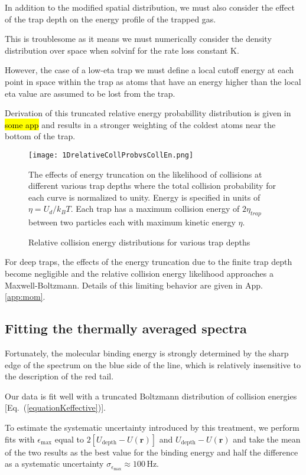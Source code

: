 In addition to the modified spatial distribution, we must also consider the effect of the trap depth on the energy profile of the trapped gas.

This is troublesome as it means we must numerically consider the density distribution over space when solvinf for the rate loss constant K. 

However, the case of a low-eta trap we must define a local cutoff energy at each point in space within the trap as atoms that have an energy higher than the local eta value are assumed to be lost from the trap.



Derivation of this truncated relative energy probabillity distribution is given in \hl{some app} and results in a stronger weighting of the coldest atoms near the bottom of the trap.
	\begin{figure} 
	\centerline{
	  \texttt{[image: 1DrelativeCollProbvsCollEn.png]}}
	  \caption{Relative collision energy distributions for various trap depths}{The effects of energy truncation on the likelihood of collisions at different various trap depths where the total collision probability for each curve is normalized to unity. Energy is specified in units of $\eta = U_d/k_B T$. Each trap has a maximum collision energy of $2\eta_{trap}$ between two particles each with maximum kinetic energy $\eta$.}
	  \label{fig:relativeCollProb}
	\end{figure}
For deep traps, the effects of the energy truncation due to the finite trap depth become negligible and the relative collision energy likelihood approaches a Maxwell-Boltzmann.
Details of this limiting behavior are given in App.\,\ref{app:mom}.


\subsection{Fitting the thermally averaged spectra} \label{sec:lowIntSpectra}



Fortunately, the molecular binding energy is strongly determined by the sharp edge of the spectrum on the blue side of the line, which is relatively insensitive to the description of the red tail.

Our data is fit well with a truncated Boltzmann distribution of collision energies [Eq.~(\ref{equationKeffective})].

To estimate the systematic uncertainty introduced by this treatment, we perform fits with $\epsilon_{\text{max}}$ equal to $2[U_{\text{depth}}-U(\mathbf{r})]$ and $U_{\text{depth}}-U(\mathbf{r})$ and take the mean of the two results as the best value for the binding energy and half the difference as a systematic uncertainty $\sigma_{\epsilon_{\text{max}}}\approx 100$\,Hz.

